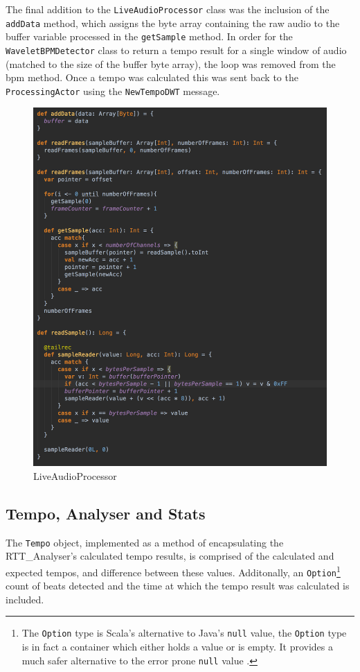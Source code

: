 \documentclass[a4paper, 11pt]{article}
\begin{document}
The final addition to the \texttt{LiveAudioProcessor} class was the inclusion of the \texttt{addData} method, which assigns the byte array containing the raw audio to the buffer variable processed in the \texttt{getSample} method. In order for the \texttt{WaveletBPMDetector} class to return a tempo result for a single window of audio (matched to the size of the buffer byte array), the loop was removed from the bpm method. Once a tempo was calculated this was sent back to the \texttt{ProcessingActor} using the \texttt{NewTempoDWT} message.

\begin{figure}[h]
	\centering
	\includegraphics[scale=0.25]{images/liveAudioPro.jpg}
	\caption{LiveAudioProcessor}
	\label{fig: liveAudPro}
\end{figure}


\subsection{Tempo, Analyser and Stats}
The \texttt{Tempo} object, implemented as a method of encapsulating the RTT\_Analyser's calculated tempo results, is comprised of the calculated and expected tempos, and difference between these values. Additonally, an \texttt{Option}\footnote{The \texttt{Option} type is Scala's alternative to Java's \texttt{null} value, the \texttt{Option} type is in fact a container which either holds a value or is empty. It provides a much safer alternative to the error prone \texttt{null} value \cite{mariusEr}.} count of beats detected and the time at which the tempo result was calculated is included.\par 
\end{document}
